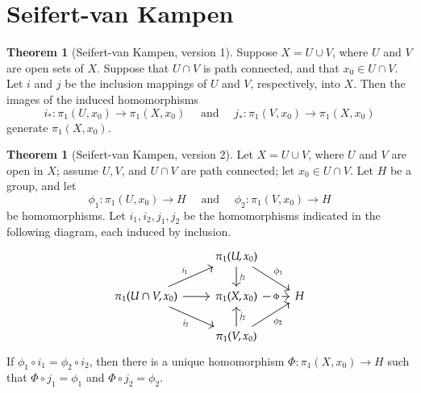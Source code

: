 \documentclass[12pt,a4paper]{book}
\theoremstyle{definition}
\newtheorem{theo}[defn]{Theorem}
\begin{document}
\section{Seifert-van Kampen}
\begin{theo}[Seifert-van Kampen, version 1]
    Suppose $X=U \cup V$, where $U$ and $V$ are open sets of $X$. Suppose that $U \cap V$ is path connected, and that $x_0 \in U \cap V$. Let $i$ and $j$ be the inclusion mappings of $U$ and $V$, respectively, into $X$. Then the images of the induced homomorphisms
    $$
        i_*: \pi_1\left(U, x_0\right) \rightarrow \pi_1\left(X, x_0\right) \quad \text { and } \quad j_*: \pi_1\left(V, x_0\right) \rightarrow \pi_1\left(X, x_0\right)
    $$
    generate $\pi_1\left(X, x_0\right)$.
    \label{theorem:Seifert-van Kampen,version 1}
\end{theo}
\begin{theo}[Seifert-van Kampen, version 2]
    Let $X=U \cup V$, where $U$ and $V$ are open in $X$; assume $U, V$, and $U \cap V$ are path connected; let $x_0 \in U \cap V$. Let $H$ be a group, and let
    $$
        \phi_1: \pi_1\left(U, x_0\right) \longrightarrow H \quad \text { and } \quad \phi_2: \pi_1\left(V, x_0\right) \longrightarrow H
    $$
    be homomorphisms. Let $i_1, i_2, j_1, j_2$ be the homomorphisms indicated in the following diagram, each induced by inclusion.
\[\begin{tikzcd}
	& {\pi_1(U,x_0)} \\
	{\pi_1(U\cap V,x_0)} & {\pi_1(X,x_0)} & H \\
	& {\pi_1(V,x_0)}
	\arrow["{j_2}", from=1-2, to=2-2]
	\arrow["{\phi_1}", from=1-2, to=2-3]
	\arrow["{i_1}", from=2-1, to=1-2]
	\arrow[from=2-1, to=2-2]
	\arrow["{i_2}"', from=2-1, to=3-2]
	\arrow["\Phi"{description}, from=2-2, to=2-3]
	\arrow["{j_2}"', from=3-2, to=2-2]
	\arrow["{\phi_2}"', from=3-2, to=2-3]
\end{tikzcd}\]
    If $\phi_1 \circ i_1=\phi_2 \circ i_2$, then there is a unique homomorphism $\Phi: \pi_1\left(X, x_0\right) \rightarrow H$ such that $\Phi \circ j_1=\phi_1$ and $\Phi \circ j_2=\phi_2$.
    \label{theorem:Seifert-van Kampen,version 2}
\end{theo}
\end{document}
